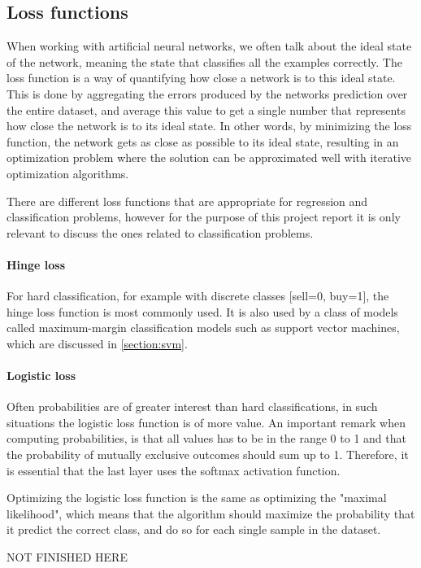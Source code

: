 \subsection{Loss functions}
When working with artificial neural networks, we often talk about the ideal state of the network, meaning the state that classifies all the examples correctly. The loss function is a way of quantifying how close a network is to this ideal state. This is done by aggregating the errors produced by the networks prediction over the entire dataset, and average this value to get a single number that represents how close the network is to its ideal state. In other words, by minimizing the loss function, the network gets as close as possible to its ideal state, resulting in an optimization problem where the solution can be approximated well with iterative optimization algorithms.

There are different loss functions that are appropriate for regression and classification problems, however for the purpose of this project report it is only relevant to discuss the ones related to classification problems.

\paragraph{Hinge loss}
For hard classification, for example with discrete classes [sell=0, buy=1], the hinge loss function is most commonly used. It is also used by a class of models called maximum-margin classification models such as support vector machines, which are discussed in \autoref{section:svm}.

\paragraph{Logistic loss}
Often probabilities are of greater interest than hard classifications, in such situations the logistic loss function is of more value. An important remark when computing probabilities, is that all values has to be in the range 0 to 1 and that the probability of mutually exclusive outcomes should sum up to 1. Therefore, it is essential that the last layer uses the softmax activation function.

Optimizing the logistic loss function is the same as optimizing the "maximal likelihood", which means that the algorithm should maximize the probability that it predict the correct class, and do so for each single sample in the dataset. 

NOT FINISHED HERE

